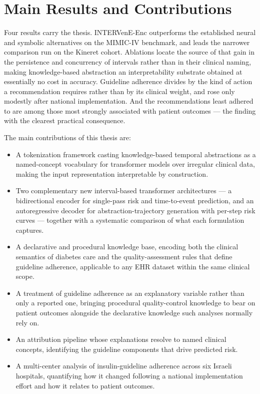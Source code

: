 \section{Main Results and Contributions}

Four results carry the thesis. INTERVenE-Enc outperforms the established
neural and symbolic alternatives on the MIMIC-IV benchmark, and leads the
narrower comparison run on the Kineret cohort. Ablations locate
the source of that gain in the persistence and concurrency of intervals rather
than in their clinical naming, making knowledge-based abstraction an
interpretability substrate obtained at essentially no cost in accuracy.
Guideline adherence divides by the kind of action a recommendation requires
rather than by its clinical weight, and rose only modestly after national
implementation. And the recommendations least adhered to are among those most
strongly associated with patient outcomes --- the finding with the clearest
practical consequence.

The main contributions of this thesis are:

\begin{itemize}
\item A tokenization framework casting knowledge-based temporal abstractions as a named-concept vocabulary for transformer models over irregular clinical data, making the input representation interpretable by construction.
\item Two complementary new interval-based transformer architectures --- a bidirectional encoder for single-pass risk and time-to-event prediction, and an autoregressive decoder for abstraction-trajectory generation with per-step risk curves --- together with a systematic comparison of what each formulation captures.
\item A declarative and procedural knowledge base, encoding both the clinical semantics of diabetes care and the quality-assessment rules that define guideline adherence, applicable to any EHR dataset within the same clinical scope.
\item A treatment of guideline adherence as an explanatory variable rather than only a reported one, bringing procedural quality-control knowledge to bear on patient outcomes alongside the declarative knowledge such analyses normally rely on.
\item An attribution pipeline whose explanations resolve to named clinical concepts, identifying the guideline components that drive predicted risk.
\item A multi-center analysis of insulin-guideline adherence across six Israeli hospitals, quantifying how it changed following a national implementation effort and how it relates to patient outcomes.
\end{itemize}

